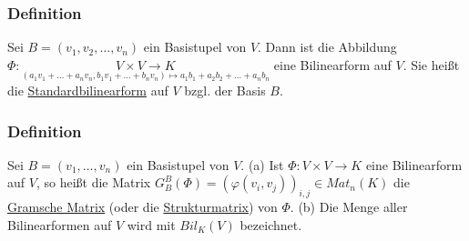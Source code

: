 \documentclass[a4paper]{article}
\newcommand{\ul}{\underline}
\let\phi\varphi
\begin{document}
\subsubsection{Definition}
Sei \(B=(v_1,v_2,\dots,v_n)\) ein Basistupel von \(V\).
Dann ist die Abbildung \(\Phi :\underset{(a_1v_1+\dots+a_nv_n,b_1v_1+\dots+b_nv_n)\mapsto a_1b_1+a_2b_2+\dots+a_nb_n}{V\times V\rightarrow K}\) eine Bilinearform auf \(V\). Sie heißt die \ul{Standardbilinearform} auf \(V\) bzgl. der Basis \(B\).
\subsubsection{Definition}
Sei \(B=(v_1,\dots,v_n)\) ein Basistupel von \(V\).
(a) Ist \(\Phi:V\times V\rightarrow K\) eine Bilinearform auf \(V\), so heißt die Matrix \(G_B^B(\Phi)=(\phi(v_i,v_j))_{i,j}\in Mat_n(K)\) die \ul{Gramsche Matrix} (oder die \ul{Strukturmatrix}) von \(\Phi\).
(b) Die Menge aller Bilinearformen auf \(V\) wird mit \(Bil_K(V)\) bezeichnet.
\end{document}
